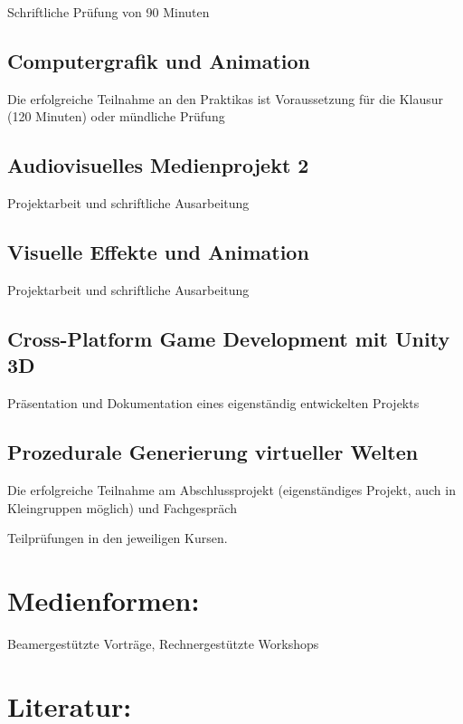 Schriftliche Prüfung von 90 Minuten

\subsection*{Computergrafik und
Animation}\label{computergrafik-und-animation-2}

Die erfolgreiche Teilnahme an den Praktikas ist Voraussetzung für die
Klausur (120 Minuten) oder mündliche Prüfung

\subsection*{Audiovisuelles Medienprojekt
2}\label{audiovisuelles-medienprojekt-2-2}

Projektarbeit und schriftliche Ausarbeitung

\subsection*{Visuelle Effekte und
Animation}\label{visuelle-effekte-und-animation-2}

Projektarbeit und schriftliche Ausarbeitung

\subsection*{Cross-Platform Game Development mit Unity
3D}\label{cross-platform-game-development-mit-unity-3d-2}

Präsentation und Dokumentation eines eigenständig entwickelten Projekts

\subsection*{Prozedurale Generierung virtueller
Welten}\label{prozedurale-generierung-virtueller-welten-2}

Die erfolgreiche Teilnahme am Abschlussprojekt (eigenständiges Projekt,
auch in Kleingruppen möglich) und Fachgespräch

Teilprüfungen in den jeweiligen Kursen.

\section*{Medienformen:}\label{medienformen-18}

Beamergestützte Vorträge, Rechnergestützte Workshops

\section*{Literatur:}\label{literatur-25}

